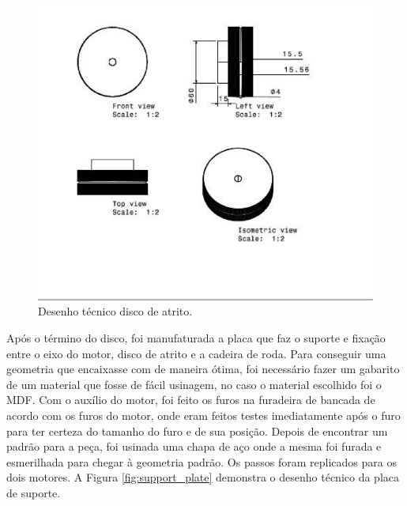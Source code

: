 \begin{figure}
    \begin{center}
        \includegraphics{figuras/drawing_disc.png}
    \end{center}
    \caption{Desenho técnico disco de atrito.}
    \label{fig:drawing_disc}
\end{figure}

Após o término do disco, foi manufaturada a placa que faz o suporte e fixação
entre o eixo do motor, disco de atrito e a cadeira de roda. Para conseguir uma
geometria que encaixasse com de maneira ótima, foi necessário fazer um gabarito
de um material que fosse de fácil usinagem, no caso o material escolhido foi o
MDF. Com o auxílio do motor, foi feito os furos na furadeira de bancada de
acordo com os furos do motor, onde eram feitos testes imediatamente após o furo
para ter certeza do tamanho do furo e de sua posição. Depois de encontrar um
padrão para a peça, foi usinada uma chapa de aço onde a mesma foi furada e
esmerilhada para chegar à geometria padrão. Os passos foram replicados para os
dois motores. A Figura \ref{fig:support_plate} demonstra o desenho técnico da
placa de suporte.

